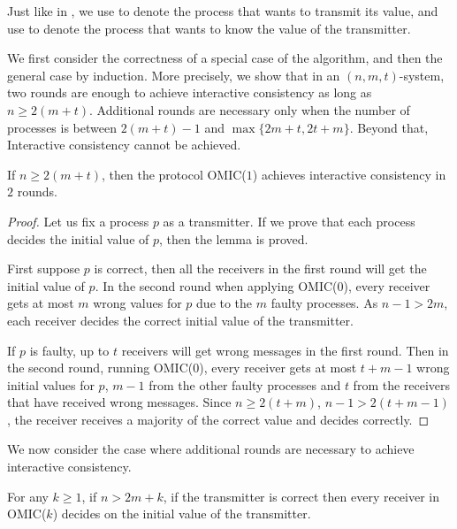 Just like in
{\cite{lamport1982byzantine}}, we use  to denote the process
that wants to transmit its value, and use  to denote the process that wants to know the value of the transmitter. 

We first consider the correctness of a special case of the algorithm, and then 
the general case by induction.
More precisely, we show that in an $( n,m,t)$-system, two rounds are enough to achieve interactive consistency as long as 
$n \geqslant 2 ( m+t )$.
Additional rounds are necessary only when the number of processes is between $2 ( m+t ) - 1$ and $ \max \{ 2m+t,2t+m \}$. Beyond that, Interactive consistency cannot be achieved.


\begin{lemma} \label{basicCase}
  \label{2roundlemma} If $n \geqslant 2 ( m+t )$, then the protocol OMIC($1$) achieves
  interactive consistency in $2$ rounds.
\end{lemma}

\begin{proof}
  Let us fix a process $p$ as a transmitter. If we prove that  each process decides  the
  initial value of $p$, then the lemma is proved.
  
  First suppose $p$ is correct, then all the receivers in the
  first round will get the initial value of $p$. In the second
  round when applying OMIC($0$), every receiver gets at most $m$ wrong
  values for $p$ due to the $m$ faulty processes.
As $n-1>2m$, each
  receiver decides the correct initial value of the transmitter.
  
  If $p$ is faulty, up to $t$ receivers will get wrong messages
  in the first round. Then in the second round, running OMIC($0$), every
  receiver gets at most $t+m-1$ wrong initial values for $p$,
  $m-1$ from the other faulty processes and $t$ from the receivers that have received wrong messages.
   Since $n\geqslant 2 (t+m)$, $n-1 > 2(t+m-1)$, the receiver receives a majority of the correct value and decides correctly.
\end{proof}

We now consider the case where additional rounds are necessary to achieve interactive consistency.

\begin{lemma} \label{reliableCorretness}
  \label{reliablecase}
  For any $k \geqslant 1$, if $n>2m+k$, if the transmitter is correct
 then every receiver in  OMIC($k$) decides on the initial value of the transmitter.
\end{lemma}

